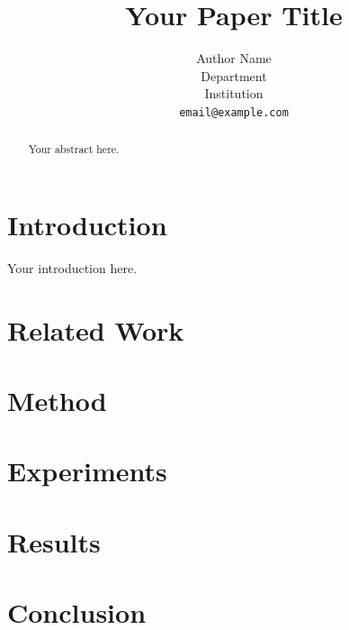 \documentclass{article}
\title{Your Paper Title}
\author{
Author Name \\
Department \\
Institution \\
\texttt{email@example.com}
}
\begin{document}
\maketitle

\begin{abstract}
Your abstract here.
\end{abstract}

\section{Introduction}

Your introduction here.

\section{Related Work}

\section{Method}

\section{Experiments}

\section{Results}

\section{Conclusion}



\end{document}
